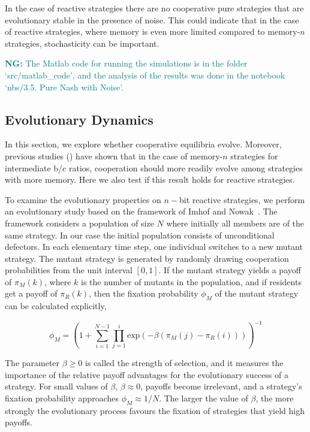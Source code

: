 \documentclass{article}
\theoremstyle{definition}
\newcommand{\nikoleta}[1]{\textcolor{teal}{{\bf NG:} #1}}
\begin{document}
In the case of reactive strategies there are no cooperative pure
strategies that are evolutionary stable in the presence of noise. This could
indicate that in the case of reactive strategies, where memory is even more
limited compared to memory-\(n\) strategies, stochasticity can be important.

\nikoleta{The Matlab code for running the simulations is in the folder
`src/matlab\_code', and the analysis of the results was done in the
notebook `nbs/3.5. Pure Nash with Noise'.}

\subsection{Evolutionary Dynamics}\label{section:evolutionary_simulations}

In this section, we explore whether cooperative equilibria evolve. Moreover,
previous studies (\citep{hilbe:PNAS:2017}) have shown that in the case of
memory-\(n\) strategies for intermediate b/c ratios, cooperation should more
readily evolve among strategies with more memory. Here we also test if this
result holds for reactive strategies.

To examine the evolutionary properties on \(n-\)bit reactive strategies, we
perform an evolutionary study based on the framework of Imhof and
Nowak~\citep{imhof:royal:2010}. The framework considers a population of size
\(N\) where initially all members are of the same strategy. In our case the
initial population consists of unconditional defectors. In each elementary time
step, one individual switches to a new mutant strategy. The mutant strategy is
generated by randomly drawing cooperation probabilities from the unit interval
\([0,1]\). If the mutant strategy yields a payoff of \(\pi_{M}(k)\), where \(k\)
is the number of mutants in the population, and if residents get a payoff of
\(\pi_{R}(k)\), then the fixation probability \(\phi_{M}\) of the mutant
strategy can be calculated explicitly,

\begin{equation}\label{eq:fixation_probability}
  \phi_{M} = \left(1 + \sum_{i=1}^{N \!- \!1} \prod_{j=1}^{i} \text{exp} (- \beta (\pi_{M}(j) \!- \!\pi_{R}(i))) \right)^{-1}
\end{equation}

The parameter \(\beta \geq 0\) is called the strength of selection, and it
measures the importance of the relative payoff advantages for the
evolutionary success of a strategy. For small values of \(\beta\), \(\beta
\approx 0\), payoffs become irrelevant, and a strategy's fixation probability
approaches \(\phi_{M} \approx 1 / N\). The larger the value of \(\beta\), the
more strongly the evolutionary process favours the fixation of strategies that
yield high payoffs.
\end{document}
